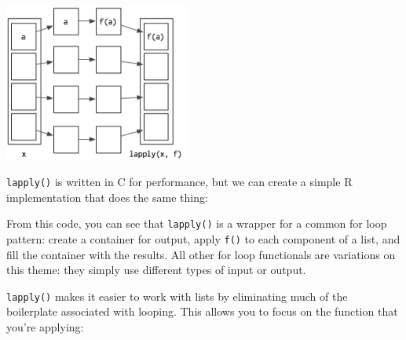 \includegraphics[width=2.4in]{diagrams/lapply.png}

\texttt{lapply()} is written in C for performance, but we can create a
simple R implementation that does the same thing:

\begin{Shaded}
\begin{Highlighting}[]
\StringTok{ }
\StringTok{ }\NormalTok{(}\NormalTok{, }
   
\StringTok{ }
\NormalTok{  \}}
\NormalTok{\}}
\end{Highlighting}
\end{Shaded}

From this code, you can see that \texttt{lapply()} is a wrapper for a
common for loop pattern: create a container for output, apply
\texttt{f()} to each component of a list, and fill the container with
the results. All other for loop functionals are variations on this
theme: they simply use different types of input or output.

\texttt{lapply()} makes it easier to work with lists by eliminating much
of the boilerplate associated with looping. This allows you to focus on
the function that you're applying:

\begin{Shaded}
\begin{Highlighting}[]
\StringTok{ }\NormalTok{(}\NormalTok{, }\NormalTok{(}\NormalTok{(}\OperatorTok{:}\NormalTok{, }\NormalTok{)), } \NormalTok{)}

\StringTok{ }\NormalTok{(}\NormalTok{, }
 
\StringTok{ }
\NormalTok{\}}
\end{Highlighting}
\end{Shaded}

